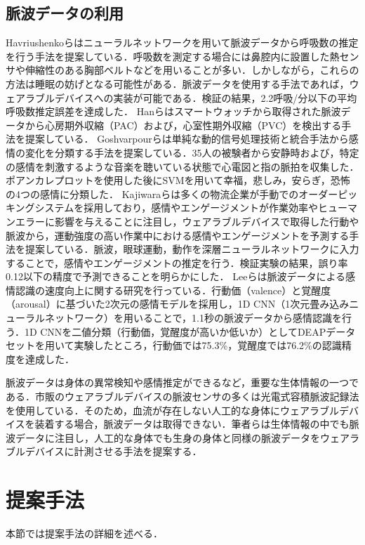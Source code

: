 \documentclass[Japanese,noauthor]{dicomopapers}
\begin{document}
\subsection{脈波データの利用}
Havriushenkoら\cite{respiratory_rate_estimation}はニューラルネットワークを用いて脈波データから呼吸数の推定を行う手法を提案している．呼吸数を測定する場合には鼻腔内に設置した熱センサや伸縮性のある胸部ベルトなどを用いることが多い．しかしながら，これらの方法は睡眠の妨げとなる可能性がある．脈波データを使用する手法であれば，ウェアラブルデバイスへの実装が可能である．検証の結果，2.2呼吸/分以下の平均呼吸数推定誤差を達成した．
Hanら\cite{arrhythmia_detection}はスマートウォッチから取得された脈波データから心房期外収縮（PAC）および，心室性期外収縮（PVC）を検出する手法を提案している．
Goshvarpourら\cite{emotion_recognition_poincare}は単純な動的信号処理技術と統合手法から感情の変化を分類する手法を提案している．35人の被験者から安静時および，特定の感情を刺激するような音楽を聴いている状態で心電図と指の脈拍を収集した．ポアンカレプロットを使用した後にSVMを用いて幸福，悲しみ，安らぎ，恐怖の4つの感情に分類した．
Kajiwaraら\cite{pulse_order_picking}は多くの物流企業が手動でのオーダーピッキングシステムを採用しており，感情やエンゲージメントが作業効率やヒューマンエラーに影響を与えることに注目し，ウェアラブルデバイスで取得した行動や脈波から，運動強度の高い作業中における感情やエンゲージメントを予測する手法を提案している．脈波，眼球運動，動作を深層ニューラルネットワークに入力することで，感情やエンゲージメントの推定を行う．検証実験の結果，誤り率0.12以下の精度で予測できることを明らかにした．
Leeら\cite{fast_emotion_recognition}は脈波データによる感情認識の速度向上に関する研究を行っている．行動価（valence）と覚醒度（arousal）に基づいた2次元の感情モデルを採用し，1D CNN（1次元畳み込みニューラルネットワーク）を用いることで，1.1秒の脈波データから感情認識を行う．1D CNNを二値分類（行動価，覚醒度が高いか低いか）としてDEAPデータセットを用いて実験したところ，行動価では75.3\%，覚醒度では76.2\%の認識精度を達成した．\par

脈波データは身体の異常検知や感情推定ができるなど，重要な生体情報の一つである．市販のウェアラブルデバイスの脈波センサの多くは光電式容積脈波記録法を使用している．そのため，血流が存在しない人工的な身体にウェアラブルデバイスを装着する場合，脈波データは取得できない．筆者らは生体情報の中でも脈波データに注目し，人工的な身体でも生身の身体と同様の脈波データをウェアラブルデバイスに計測させる手法を提案する．



\section{提案手法}
\label{sec:method}
本節では提案手法の詳細を述べる．
\end{document}
